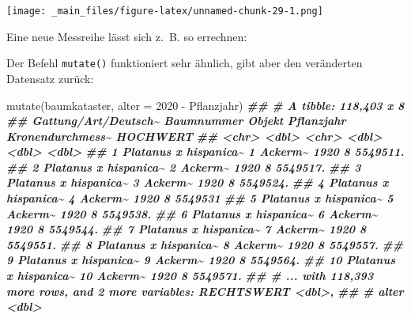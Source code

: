 \documentclass[
  ngerman,
]{article}
\newenvironment{Shaded}{\begin{snugshade}}{\end{snugshade}}
\newcommand{\AttributeTok}[1]{\textcolor[rgb]{0.77,0.63,0.00}{#1}}
\newcommand{\DecValTok}[1]{\textcolor[rgb]{0.00,0.00,0.81}{#1}}
\newcommand{\DocumentationTok}[1]{\textcolor[rgb]{0.56,0.35,0.01}{\textbf{\textit{#1}}}}
\newcommand{\FunctionTok}[1]{\textcolor[rgb]{0.00,0.00,0.00}{#1}}
\newcommand{\NormalTok}[1]{#1}
\newcommand{\OtherTok}[1]{\textcolor[rgb]{0.56,0.35,0.01}{#1}}
\newcommand{\SpecialCharTok}[1]{\textcolor[rgb]{0.00,0.00,0.00}{#1}}
\begin{document}
\texttt{[image: \_main\_files/figure-latex/unnamed-chunk-29-1.png]}

Eine neue Messreihe lässt sich z.~B. so errechnen:

\begin{Shaded}
\end{Shaded}

Der Befehl \texttt{mutate()} funktioniert sehr ähnlich, gibt aber den veränderten Datensatz zurück:

\begin{Shaded}
\begin{Highlighting}[]
\FunctionTok{mutate}\NormalTok{(baumkataster, }\AttributeTok{alter =} \DecValTok{2020} \SpecialCharTok{{-}}\NormalTok{ Pflanzjahr)}
\DocumentationTok{\#\# \# A tibble: 118,403 x 8}
\DocumentationTok{\#\#    \textasciigrave{}Gattung/Art/Deutsch\textasciitilde{} Baumnummer Objekt  Pflanzjahr Kronendurchmess\textasciitilde{} HOCHWERT}
\DocumentationTok{\#\#    \textless{}chr\textgreater{}                      \textless{}dbl\textgreater{} \textless{}chr\textgreater{}        \textless{}dbl\textgreater{}            \textless{}dbl\textgreater{}    \textless{}dbl\textgreater{}}
\DocumentationTok{\#\#  1 Platanus x hispanica\textasciitilde{}          1 Ackerm\textasciitilde{}       1920                8 5549511.}
\DocumentationTok{\#\#  2 Platanus x hispanica\textasciitilde{}          2 Ackerm\textasciitilde{}       1920                8 5549517.}
\DocumentationTok{\#\#  3 Platanus x hispanica\textasciitilde{}          3 Ackerm\textasciitilde{}       1920                8 5549524.}
\DocumentationTok{\#\#  4 Platanus x hispanica\textasciitilde{}          4 Ackerm\textasciitilde{}       1920                8 5549531 }
\DocumentationTok{\#\#  5 Platanus x hispanica\textasciitilde{}          5 Ackerm\textasciitilde{}       1920                8 5549538.}
\DocumentationTok{\#\#  6 Platanus x hispanica\textasciitilde{}          6 Ackerm\textasciitilde{}       1920                8 5549544.}
\DocumentationTok{\#\#  7 Platanus x hispanica\textasciitilde{}          7 Ackerm\textasciitilde{}       1920                8 5549551.}
\DocumentationTok{\#\#  8 Platanus x hispanica\textasciitilde{}          8 Ackerm\textasciitilde{}       1920                8 5549557.}
\DocumentationTok{\#\#  9 Platanus x hispanica\textasciitilde{}          9 Ackerm\textasciitilde{}       1920                8 5549564.}
\DocumentationTok{\#\# 10 Platanus x hispanica\textasciitilde{}         10 Ackerm\textasciitilde{}       1920                8 5549571.}
\DocumentationTok{\#\# \# ... with 118,393 more rows, and 2 more variables: RECHTSWERT \textless{}dbl\textgreater{},}
\DocumentationTok{\#\# \#   alter \textless{}dbl\textgreater{}}
\end{Highlighting}
\end{Shaded}
\end{document}
